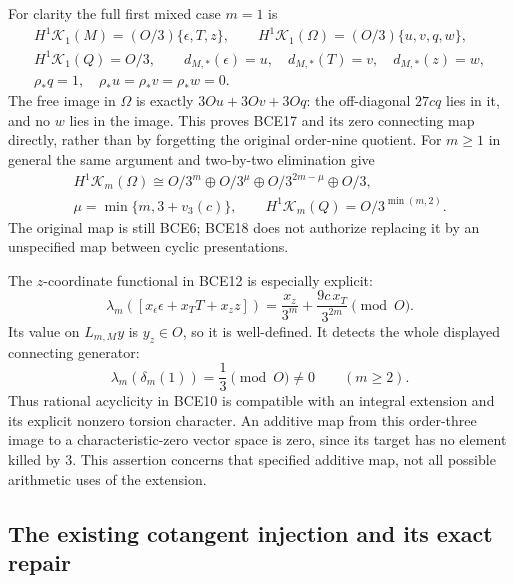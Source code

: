 For clarity the full first mixed case \(m=1\) is
\begin{equation}\tag{BCE17}
\begin{gathered}
H^1\mathcal K_1(M)=(O/3)\{\epsilon,T,z\},\qquad
H^1\mathcal K_1(\Omega)=(O/3)\{u,v,q,w\},\\
H^1\mathcal K_1(Q)=O/3,\qquad
d_{M,*}(\epsilon)=u,\quad d_{M,*}(T)=v,\quad d_{M,*}(z)=w,\\
\rho_*q=1,\quad \rho_*u=\rho_*v=\rho_*w=0 .
\end{gathered}
\end{equation}
The free image in \(\Omega\) is exactly \(3Ou+3Ov+3Oq\):
the off-diagonal \(27cq\) lies in it, and no \(w\) lies in the
image. This proves BCE17 and its zero connecting map directly,
rather than by forgetting the original order-nine quotient.
For \(m\ge1\) in general the same argument and two-by-two
elimination give
\begin{equation}\tag{BCE18}
\begin{gathered}
H^1\mathcal K_m(\Omega)\cong
O/3^m\oplus O/3^\mu\oplus O/3^{2m-\mu}\oplus O/3,\\
\mu=\min\{m,3+v_3(c)\},\qquad
H^1\mathcal K_m(Q)=O/3^{\min(m,2)} .
\end{gathered}
\end{equation}
The original map is still BCE6; BCE18 does not authorize replacing
it by an unspecified map between cyclic presentations.

The \(z\)-coordinate functional in BCE12 is especially explicit:
\begin{equation}\tag{BCE19}
\lambda_m([x_\epsilon\epsilon+x_TT+x_zz])
=\frac{x_z}{3^m}+\frac{9c\,x_T}{3^{2m}}\pmod O .
\end{equation}
Its value on \(L_{m,M}y\) is \(y_z\in O\), so it is well-defined.
It detects the whole displayed connecting generator:
\begin{equation}\tag{BCE20}
\lambda_m(\delta_m(1))=\frac13\pmod O\ne0
\qquad(m\ge2).
\end{equation}
Thus rational acyclicity in BCE10 is compatible with an integral
extension and its explicit nonzero torsion character. An additive
map from this order-three image to a characteristic-zero vector
space is zero, since its target has no element killed by 3.
This assertion concerns that specified additive map, not all
possible arithmetic uses of the extension.

\subsection{The existing cotangent injection and its exact repair}

